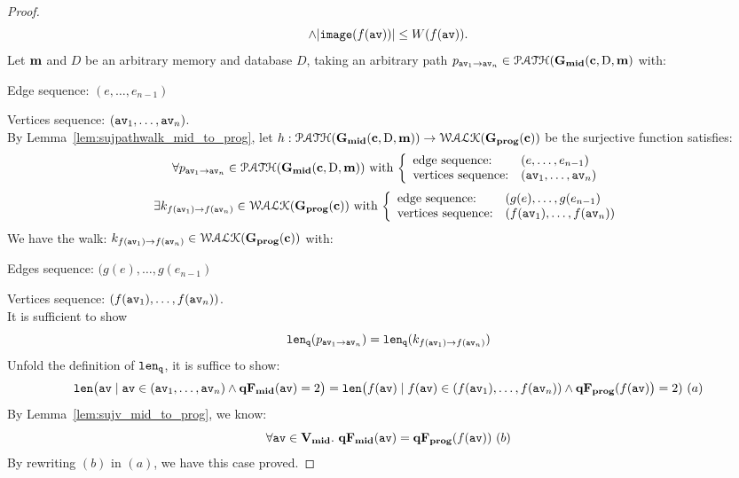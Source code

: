 \documentclass[a4paper,11pt]{article}
\begin{document}
\begin{proof}
$$\land |\mathtt{image}(f(\mathtt{av}))| \leq W(f(\mathtt{av})).
$$
%
%
%
Let ${\boldsymbol{\mathbf{m}}}$ and $D$ be an arbitrary memory and database $D$,
taking an arbitrary path $p_{\mathtt{av}_1 \to \mathtt{av}_n} \in \mathcal{PATH}(\mathtt{\bf{G_{mid}}}({\boldsymbol{\mathbf{c}}}, \text{D}, {\boldsymbol{\mathbf{m}}})$ with:
%
\item Edge sequence: $(e, \ldots, e_{n-1})$
%
\item Vertices sequence: $(\mathtt{av}_1, \ldots, \mathtt{av}_n)$.
\\
By Lemma~\ref{lem:sujpathwalk_mid_to_prog}, let $h: \mathcal{PATH}(\mathtt{\bf{G_{mid}}}({\boldsymbol{\mathbf{c}}}, \text{D}, {\boldsymbol{\mathbf{m}}})) \to \mathcal{WALK}(\mathtt{\bf{G_{prog}}}({\boldsymbol{\mathbf{c}}}))$ be the surjective function satisfies:
%
\[
	\forall p_{\av_1 \to \av_n} \in \paths(\midG(\ssa{c}, \text{D}, \ssa{m}))
	\text{ with }
	\left\{
	\begin{array}{ll}
	\mbox{edge sequence:} & (e, \ldots, e_{n-1})
	\\ 
	\mbox{vertices sequence:} & (\av_1, \ldots, \av_n)
	\end{array}
	\right.
\]
%
\[
	\exists k_{f(\av_1) \to f(\av_n)} \in \walks(\progG(\ssa{c}))
	\text{ with }
	\left\{
	\begin{array}{ll}
	\mbox{edge sequence:} & (g(e), \ldots, g(e_{n-1}) 
	\\ 
	\mbox{vertices sequence:} & (f(\av_1), \ldots, f(\av_{n}))
	\end{array}
	\right.
\]
%
We have the walk:
$k_{f(\mathtt{av}_1) \to f(\mathtt{av}_n)} \in \mathcal{WALK}(\mathtt{\bf{G_{prog}}}({\boldsymbol{\mathbf{c}}}))$ with:
%
\item Edges sequence: $(g(e), \ldots, g(e_{n-1}) $
%
\item Vertices sequence: $(f(\mathtt{av}_1), \ldots, f(\mathtt{av}_{n}))$.
\\
It is sufficient to show 
%
\[
	\mathtt{len}_{\tt q}(p_{\mathtt{av}_1 \to \mathtt{av}_n}) = \mathtt{len}_{\tt q}(k_{f(\mathtt{av}_1) \to f(\mathtt{av}_n)})
\]
%
Unfold the definition of $\mathtt{len}_{\tt q}$, it is suffice to show:
\[
\mathtt{len} \big( \mathtt{av} \mid \mathtt{av} \in (\mathtt{av}_1, \ldots, \mathtt{av}_n) \land \mathtt{\bf{qF_{mid}}}(\mathtt{av}) = 2 \big) 
= \mathtt{len} \big(f(\mathtt{av}) \mid f(\mathtt{av}) \in (f(\mathtt{av}_1), \ldots, f(\mathtt{av}_{n})) \land \mathtt{\bf{qF_{prog}}}(f(\mathtt{av})\big) = 2)	
~ (a)
\]
%
By Lemma~\ref{lem:sujv_mid_to_prog}, we know:
%
\[
	\forall \mathtt{av} \in \mathtt{\bf{V_{mid}}}. ~ \mathtt{\bf{qF_{mid}}}(\mathtt{av}) = \mathtt{\bf{qF_{prog}}}(f(\mathtt{av})) ~(b)
\]
By rewriting $(b)$ in $(a)$, we have this case proved.

\end{proof}

\newpage


\end{document}
